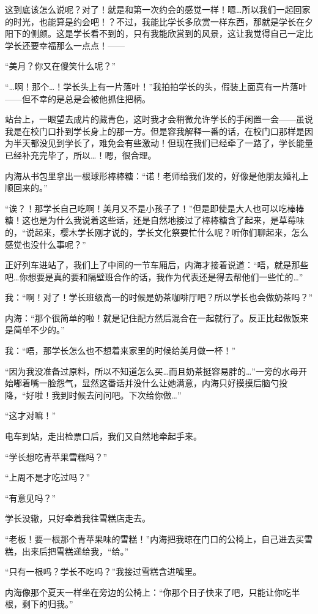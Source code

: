 这到底该怎么说呢？对了！就是和第一次约会的感觉一样！嗯…所以我们一起回家的时光，也能算是约会吧！？不过，我能比学长多欣赏一样东西，那就是学长在夕阳下的侧颜。这是学长看不到的，只有我能欣赏到的风景，这让我觉得自己一定比学长还要幸福那么一点点！——

“美月？你又在傻笑什么呢？”

“…啊！那个…！学长头上有一片落叶！”我拍拍学长的头，假装上面真有一片落叶——但不幸的是总是会被他抓住把柄。

站台上，一眼望去成片的藏青色，这时我才会稍微允许学长的手闲置一会——虽说我是在校门口扑到学长身上的那一方。但是容我解释一番的话，在校门口那样是因为半天都没见到学长了，难免会有些激动！但现在我们已经牵了一路了，学长能量已经补充完毕了，所以…！嗯，很合理。

内海从书包里拿出一根球形棒棒糖：“诺！老师给我们发的，好像是他朋友婚礼上顺回来的。”

“诶？！那学长自己吃啊！美月又不是小孩子了！”但是即使是大人也可以吃棒棒糖！这也是为什么我说着这些话，还是自然地接过了棒棒糖含了起来，是草莓味的，“说起来，樱木学长刚才说的，学长文化祭要忙什么呢？听你们聊起来，怎么感觉也没什么事呢？”

正好列车进站了，我们上了中间的一节车厢后，内海才接着说道：“唔，就是那些吧…你想要是真的要和隔壁班合作的话，我作为代表还是得去帮他们一些忙的…”

我：“啊！对了！学长班级高一的时候是奶茶咖啡厅吧？所以学长也会做奶茶吗？”

内海：“那个很简单的啦！就是记住配方然后混合在一起就行了。反正比起做饭来是简单不少的。”

我：“唔，那学长怎么也不想着来家里的时候给美月做一杯！”

“因为我没准备过原料，所以不知道怎么买…而且奶茶挺容易胖的…”一旁的水母开始嘟着嘴一脸怨气，显然这番话并没什么让她满意，内海只好摸摸后脑勺投降，“好啦！我到时候去问问吧。下次给你做…”

“这才对嘛！”

电车到站，走出检票口后，我们又自然地牵起手来。

“学长想吃青苹果雪糕吗？”

“上周不是才吃过吗？”

“有意见吗？”

学长没辙，只好牵着我往雪糕店走去。

“老板！要一根那个青苹果味的雪糕！”内海把我晾在门口的公椅上，自己进去买雪糕，出来后把雪糕递给我，“给。”

“只有一根吗？学长不吃吗？”我接过雪糕含进嘴里。

内海像那个夏天一样坐在旁边的公椅上：“你那个日子快来了吧，只能让你吃半根，剩下的归我。”

